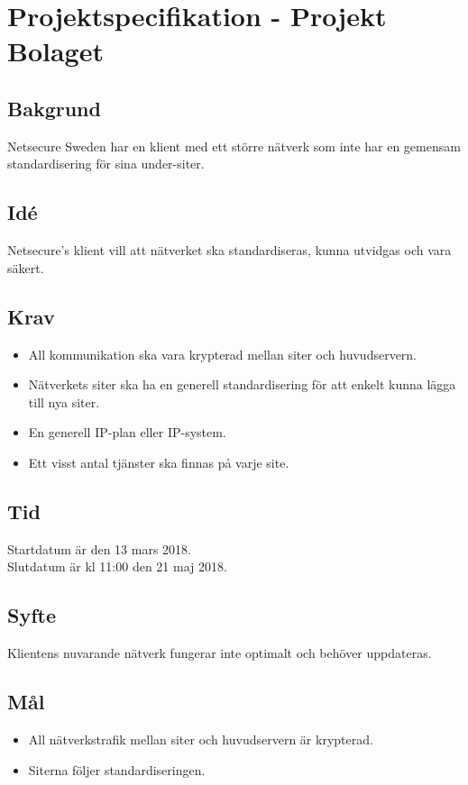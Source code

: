 \section*{Projektspecifikation - Projekt Bolaget}
\subsection*{Bakgrund}
Netsecure Sweden har en klient med ett större nätverk som inte har en gemensam standardisering för sina under-siter.

\subsection*{Idé}
Netsecure's klient vill att nätverket ska standardiseras, kunna utvidgas och vara säkert.

\subsection*{Krav}
\begin{itemize}
    \item All kommunikation ska vara krypterad mellan siter och huvudservern.
    \item Nätverkets siter ska ha en generell standardisering för att enkelt kunna lägga till nya siter.
    \item En generell IP-plan eller IP-system.
    \item Ett visst antal tjänster ska finnas på varje site.
\end{itemize}

\subsection*{Tid}
Startdatum är den 13 mars 2018. \\
Slutdatum är kl 11:00 den 21 maj 2018.

\subsection*{Syfte}
Klientens nuvarande nätverk fungerar inte optimalt och behöver uppdateras.

\subsection*{Mål}
\begin{itemize}
    \item All nätverkstrafik mellan siter och huvudservern är krypterad.
    \item Siterna följer standardiseringen.
\end{itemize}

